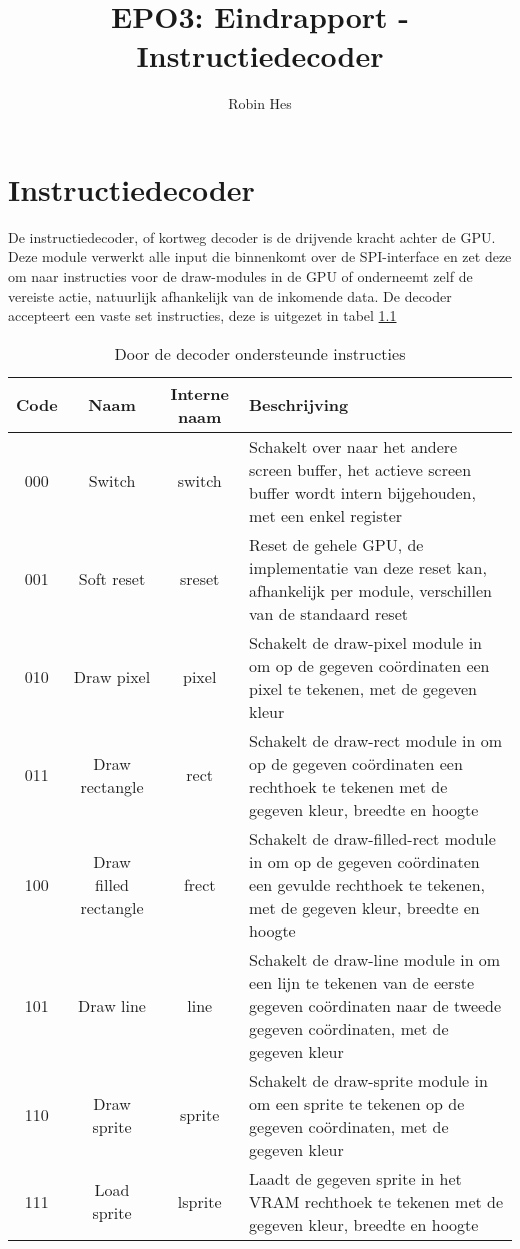 \documentclass{scrartcl} %
\title{EPO3: Eindrapport - Instructiedecoder}
\author{Robin Hes}
\begin{document}
\chapter{Instructiedecoder}
\label{ch:decoder}

De instructiedecoder, of kortweg decoder is de drijvende kracht achter de GPU. Deze module verwerkt alle input die binnenkomt over de SPI-interface en zet deze om naar instructies voor de draw-modules in de GPU of onderneemt zelf de vereiste actie, natuurlijk afhankelijk van de inkomende data. De decoder accepteert een vaste set instructies, deze is uitgezet in tabel \ref{tab:decoder-instruction}

\begin{table}[H]
	\centering
	\caption{Door de decoder ondersteunde instructies}
	\label{tab:decoder-instruction}
	\begin{tabular}{c c c l}
		\hline\hline
		Code & Naam & Interne naam & Beschrijving \\
		\hline
		000 & Switch & switch & Schakelt over naar het andere screen buffer, het actieve screen buffer wordt intern bijgehouden, met een enkel register \\
		001 & Soft reset & sreset & Reset de gehele GPU, de implementatie van deze reset kan, afhankelijk per module, verschillen van de standaard reset \\
		010 & Draw pixel & pixel & Schakelt de draw-pixel module in om op de gegeven coördinaten een pixel te tekenen, met de gegeven kleur \\
		011 & Draw rectangle & rect & Schakelt de draw-rect module in om op de gegeven coördinaten een rechthoek te tekenen met de gegeven kleur, breedte en hoogte \\
		100 & Draw filled rectangle & frect & Schakelt de draw-filled-rect module in om op de gegeven coördinaten een gevulde rechthoek te tekenen, met de gegeven kleur, breedte en hoogte \\
		101 & Draw line & line & Schakelt de draw-line module in om een lijn te tekenen van de eerste gegeven coördinaten naar de tweede gegeven coördinaten, met de gegeven kleur \\
		110 & Draw sprite & sprite & Schakelt de draw-sprite module in om een sprite te tekenen op de gegeven coördinaten, met de gegeven kleur \\
		111 & Load sprite & lsprite & Laadt de gegeven sprite in het VRAM rechthoek te tekenen met de gegeven kleur, breedte en hoogte \\
		\end{tabular}
\end{table}
\end{document}
